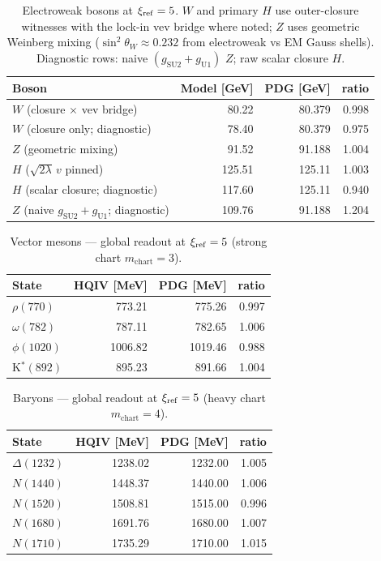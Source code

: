 \documentclass[11pt]{amsart}
\newcommand{\diagnosticrow}{\rowcolor{black!6}}
\begin{document}
\begin{table}[ht]
  \centering
  \caption{Electroweak bosons at $\xi_{\rm ref}=5$. $W$ and primary $H$ use outer-closure
    witnesses with the lock-in vev bridge where noted; $Z$ uses geometric Weinberg mixing
    ($\sin^2\theta_W \approx 0.232$ from electroweak vs EM Gauss shells).
    Diagnostic rows: naive $(g_{\mathrm{SU2}}+g_{\mathrm{U1}})$ $Z$; raw scalar closure $H$.}
  \label{tab:ew-bosons}
  \begin{tabular}{lrrr}
    \toprule
    Boson & Model [GeV] & PDG [GeV] & ratio \\
    \midrule
    $W$ (closure $\times$ vev bridge) & 80.22 & 80.379 & 0.998 \\
    \diagnosticrow
    $W$ (closure only; diagnostic) & 78.40 & 80.379 & 0.975 \\
    $Z$ (geometric mixing) & 91.52 & 91.188 & 1.004 \\
    $H$ ($\sqrt{2\lambda}\,v$ pinned) & 125.51 & 125.11 & 1.003 \\
    \diagnosticrow
    $H$ (scalar closure; diagnostic) & 117.60 & 125.11 & 0.940 \\
    \diagnosticrow
    $Z$ (naive $g_{\mathrm{SU2}}+g_{\mathrm{U1}}$; diagnostic) & 109.76 & 91.188 & 1.204 \\
    \bottomrule
  \end{tabular}
\end{table}

\begin{table}[ht]
  \centering
  \caption{Vector mesons --- global readout at $\xi_{\rm ref}=5$ (strong chart $m_{\mathrm{chart}}=3$).}
  \label{tab:meson-global}
  \begin{tabular}{lrrr}
    \toprule
    State & HQIV [MeV] & PDG [MeV] & ratio \\
    \midrule
    $\rho(770)$   & 773.21 & 775.26 & 0.997 \\
    $\omega(782)$ & 787.11 & 782.65 & 1.006 \\
    $\phi(1020)$  & 1006.82 & 1019.46 & 0.988 \\
    K$^*(892)$    & 895.23 & 891.66 & 1.004 \\
    \bottomrule
  \end{tabular}
\end{table}

\begin{table}[ht]
  \centering
  \caption{Baryons --- global readout at $\xi_{\rm ref}=5$ (heavy chart $m_{\mathrm{chart}}=4$).}
  \label{tab:baryon-global}
  \begin{tabular}{lrrr}
    \toprule
    State & HQIV [MeV] & PDG [MeV] & ratio \\
    \midrule
    $\Delta(1232)$ & 1238.02 & 1232.00 & 1.005 \\
    $N(1440)$     & 1448.37 & 1440.00 & 1.006 \\
    $N(1520)$     & 1508.81 & 1515.00 & 0.996 \\
    $N(1680)$     & 1691.76 & 1680.00 & 1.007 \\
    $N(1710)$     & 1735.29 & 1710.00 & 1.015 \\
    \bottomrule
  \end{tabular}
\end{table}
\end{document}
